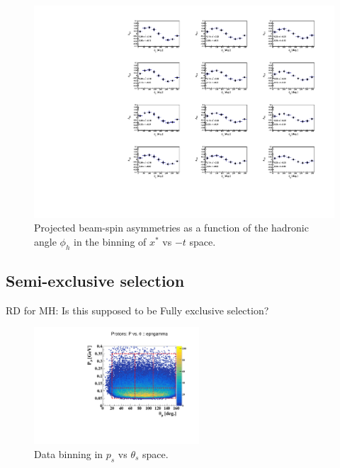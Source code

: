 \begin{figure}[htb]
  \centering
    \includegraphics[width=1.1\textwidth,clip]{figs/pdf/BSA_incoherent_Phi_x_t.pdf}
  \caption{Projected beam-spin asymmetries as a function of the hadronic angle 
   $\phi_h$ in the binning of $x^{*}$ vs $-t$ space.
   \label{fig:alu_semi}}
\end{figure}




\subsection{Semi-exclusive selection}
RD for MH: Is this supposed to be Fully exclusive selection?

\begin{figure}[htb]
  \centering
\includegraphics[width=0.55\textwidth,clip,trim=0mm 0mm 0mm 
   20mm]{figs_epngamma/pdf/epngamma_p_p_theta.pdf}
  \caption{Data binning in $p_s$ vs $\theta_s$ space.
   \label{fig:binning_x_t}}
\end{figure}

